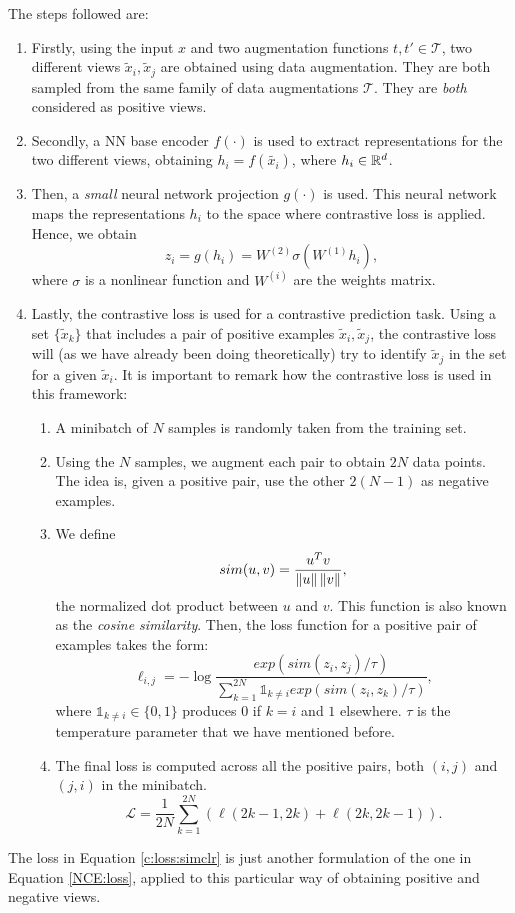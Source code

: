The steps followed are:
\begin{enumerate}
\item Firstly, using the input $x$ and two augmentation functions $t,t' \in \mathcal T$, two different views $\tilde x_i,\tilde x_j$ are obtained using data augmentation. They are both sampled from the same family of data augmentations $\mathcal T$. They are \emph{both} considered as positive views.
\item Secondly, a NN base encoder $f(\cdot)$ is used to extract representations for the two different views, obtaining $h_i = f(\tilde{x_i})$, where $h_i \in \mathbb{R}^d$.  

\item Then, a \emph{small} neural network projection $g(\cdot)$ is used. This neural network maps the representations $h_i$ to the space where contrastive loss is applied. Hence, we obtain 
$$
z_i = g(h_i) = W^{(2)}\sigma(W^{(1)}h_i),$$
where $\sigma$ is a nonlinear function and $W^{(i)}$ are the weights matrix.

\item Lastly, the contrastive loss is used for a contrastive prediction task. Using a set $\{\tilde x_k \}$ that includes a pair of positive examples $\tilde x_i,\tilde x_j$, the contrastive loss will (as we have already been doing theoretically) try to identify $\tilde x_j$ in the set for a given $\tilde x_i$. It is important to remark how the contrastive loss is used in this framework:
\begin{enumerate}
\item A minibatch of $N$ samples is randomly taken from the training set. 
\item Using the $N$ samples, we augment each pair to obtain $2N$ data points. The idea is, given a positive pair, use the other $2(N-1)$ as negative examples.
\item We define
\[
sim(u,v) = \frac{u^T v}{\left\lVert u\right\rVert\left\lVert v\right\rVert},    
\]
the normalized dot product between $u$ and $v$. This function is also known as the \emph{cosine similarity}. Then, the loss function for a positive pair of examples takes the form:
\begin{equation}\label{c:loss:simclr:ind}
\ell_{i,j} = -\log \frac{exp(sim(z_i,z_j)/\tau)}{\sum_{k=1}^{2N} \mathbb{1}_{k \neq i} exp(sim(z_i,z_k)/\tau)},    
\end{equation}
where $\mathbb{1}_{k \neq i} \in \{0,1\}$ produces $0$ if $k = i$ and $1$ elsewhere. $\tau$ is the temperature parameter that we have mentioned before.
\item The final loss is computed across all the positive pairs, both $(i,j)$ and $(j,i)$ in the minibatch.
\begin{equation}\label{c:loss:simclr}
\mathcal L = \frac{1}{2N} \sum_{k=1}^{2N} \left(\ell(2k-1,2k) + \ell(2k,2k-1)\right).
\end{equation}
\end{enumerate}
\end{enumerate}
\begin{remark}
The loss in Equation \eqref{c:loss:simclr} is just another formulation of the one in Equation \eqref{NCE:loss}, applied to this particular way of obtaining positive and negative views.
\end{remark}

